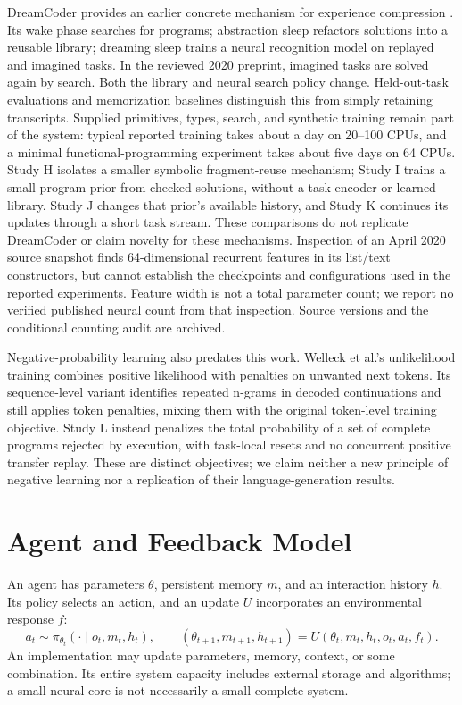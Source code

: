 \documentclass[11pt]{article}
\begin{document}
DreamCoder provides an earlier concrete mechanism for experience compression
\cite{dreamcoder}. Its wake phase searches for programs; abstraction sleep
refactors solutions into a reusable library; dreaming sleep trains a neural
recognition model on replayed and imagined tasks. In the reviewed 2020
preprint, imagined tasks are solved again by search. Both the library and
neural search policy change. Held-out-task evaluations and memorization
baselines distinguish this from simply retaining transcripts. Supplied
primitives, types, search, and synthetic training remain part of the system:
typical reported training takes about a day on 20--100 CPUs, and a minimal
functional-programming experiment takes about five days on 64 CPUs. Study H
isolates a smaller symbolic fragment-reuse mechanism; Study I trains a small
program prior from checked solutions, without a task encoder or learned
library. Study J changes that prior's available history, and Study K continues its
updates through a short task stream. These comparisons
do not replicate DreamCoder or claim novelty for these mechanisms.
Inspection of an April 2020 source snapshot finds 64-dimensional recurrent
features in its list/text constructors, but cannot establish the checkpoints
and configurations used in the reported experiments. Feature width is not a
total parameter count; we report no verified published neural count from that
inspection. Source versions and the conditional counting audit are archived.

Negative-probability learning also predates this work. Welleck et al.'s
unlikelihood training \cite{unlikelihood} combines positive likelihood with
penalties on unwanted next tokens. Its sequence-level variant identifies
repeated n-grams in decoded continuations and still applies token penalties,
mixing them with the original token-level training objective. Study L instead
penalizes the total probability of a set of complete programs rejected by
execution, with task-local resets and no concurrent positive transfer replay.
These are distinct objectives; we claim neither a new principle of negative
learning nor a replication of their language-generation results.

\section{Agent and Feedback Model}
An agent has parameters $\theta$, persistent memory $m$, and an interaction
history $h$. Its policy selects an action, and an update $U$ incorporates an
environmental response $f$:
\[
 a_t\sim\pi_{\theta_t}(\cdot\mid o_t,m_t,h_t),\qquad
 (\theta_{t+1},m_{t+1},h_{t+1})=U(\theta_t,m_t,h_t,o_t,a_t,f_t).
\]
An implementation may update parameters, memory, context, or some combination.
Its entire system capacity includes external storage and algorithms; a small
neural core is not necessarily a small complete system.
\end{document}
